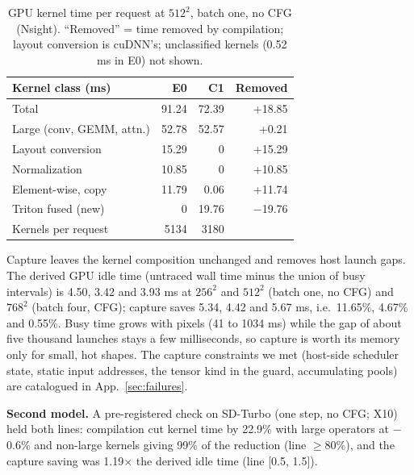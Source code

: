 \documentclass[conference]{IEEEtran}
\newcommand{\tn}[1]{#1}%
\begin{document}
\begin{table}[t]
\caption{GPU kernel time per request at $512^2$, batch one, no CFG (Nsight). ``Removed'' = time removed by compilation; layout conversion is cuDNN's; unclassified kernels (0.52 ms in E0) not shown.}
\label{m:tab:kernels}
\centering\footnotesize
\setlength{\tabcolsep}{3pt}
\begin{tabular}{lrrr}
\toprule
Kernel class (ms) & E0 & C1 & Removed\\
\midrule
Total & 91.24 & 72.39 & +18.85 \\
\quad Large (conv, GEMM, attn.) & 52.78 & 52.57 & +0.21 \\
\quad Layout conversion & 15.29 & 0 & +15.29\\
\quad Normalization & 10.85 & 0 & +10.85\\
\quad Element-wise, copy & 11.79 & 0.06 & +11.74\\
\quad Triton fused (new) & 0 & 19.76 & $-$19.76\\
Kernels per request & 5134 & 3180 & \\
\bottomrule
\end{tabular}
\end{table}

Capture leaves the kernel composition unchanged and removes host launch gaps. The derived GPU idle time (untraced wall time minus the union of busy intervals) is \tn{4.50}, \tn{3.42} and \tn{3.93} ms at $256^2$ and $512^2$ (batch one, no CFG) and $768^2$ (batch four, CFG); capture saves \tn{5.34}, \tn{4.42} and \tn{5.67} ms, i.e.\ \tn{11.65\%}, \tn{4.67\%} and \tn{0.55\%}. Busy time grows with pixels (\tn{41} to \tn{1034} ms) while the gap of about five thousand launches stays a few milliseconds, so capture is worth its memory only for small, hot shapes. The capture constraints we met (host-side scheduler state, static input addresses, the tensor kind in the guard, accumulating pools) are catalogued in App.~\ref{sec:failures}.

\textbf{Second model.} A pre-registered check on SD-Turbo (one step, no CFG; X10) held both lines: compilation cut kernel time by \tn{22.9\%} with large operators at \tn{$-$0.6\%} and non-large kernels giving \tn{99\%} of the reduction (line $\ge$80\%), and the capture saving was \tn{1.19}$\times$ the derived idle time (line [0.5, 1.5]).
\end{document}
